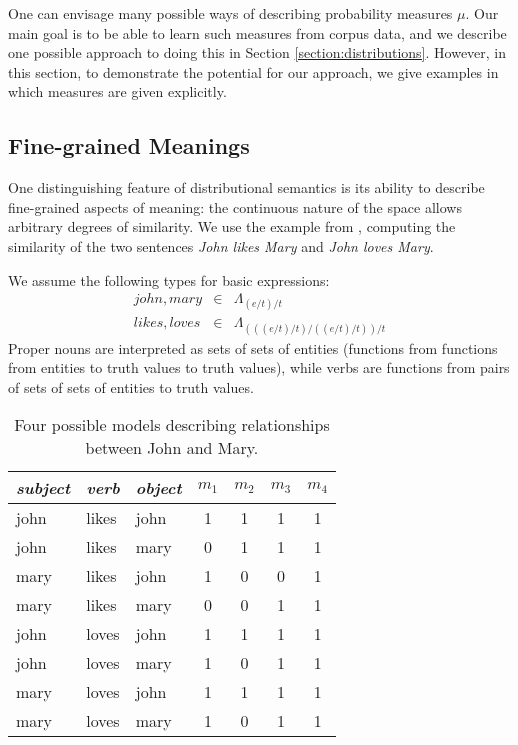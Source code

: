 \documentclass[letterpaper]{article}
\begin{document}
One can envisage many possible ways of describing probability measures
$\mu$. Our main goal is to be able to learn such measures from corpus
data, and we describe one possible approach to doing this in Section
\ref{section:distributions}. However, in this section, to demonstrate
the potential for our approach, we give examples in which measures are
given explicitly.
 
\subsection{Fine-grained Meanings}

One distinguishing feature of distributional semantics is its ability
to describe fine-grained aspects of meaning: the continuous nature of
the space allows arbitrary degrees of similarity. We use the example
from \cite{Clark:08}, computing the similarity of the two sentences
\emph{John likes Mary} and \emph{John loves Mary}.

We assume the following types for basic expressions:
\begin{eqnarray*}
\mathit{john},\mathit{mary} & \in & \Lambda_{(e/t)/t}\\
\mathit{likes}, \mathit{loves} & \in & \Lambda_{(((e/t)/t)/((e/t)/t))/t}
\end{eqnarray*}
Proper nouns are interpreted as sets of sets of entities (functions
from functions from entities to truth values to truth values), while
verbs are functions from pairs of sets of sets of entities to truth
values.

\begin{table}
\begin{center}
\begin{tabular}{|l|l|l||c|c|c|c|}
\hline
\emph{subject} & \emph{verb} & \emph{object} & $m_1$ & $m_2$ & $m_3$ & $m_4$\\
\hline
john & likes & john & 1 & 1 & 1 & 1\\
john & likes & mary & 0 & 1 & 1 & 1\\
mary & likes & john & 1 & 0 & 0 & 1\\
mary & likes & mary & 0 & 0 & 1 & 1\\
john & loves & john & 1 & 1 & 1 & 1\\
john & loves & mary & 1 & 0 & 1 & 1\\
mary & loves & john & 1 & 1 & 1 & 1\\
mary & loves & mary & 1 & 0 & 1 & 1\\
\hline
\end{tabular}
\caption{Four possible models describing relationships between John
  and Mary.}
\end{center}
\label{table:models}
\end{table}
\end{document}
